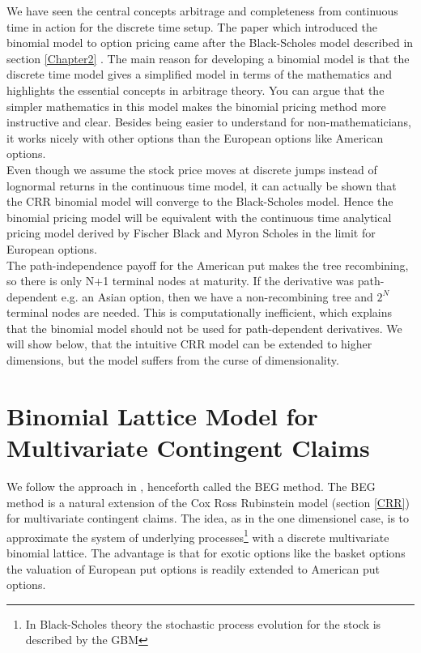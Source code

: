 We have seen the central concepts arbitrage and completeness from continuous time in action for the discrete time setup. The paper \parencite{CRR} which introduced the binomial model to option pricing came after the Black-Scholes model described in section \ref{Chapter2} \parencite{B-S-Paper}. The main reason for developing a binomial model is that the discrete time model gives a simplified model in terms of the mathematics and highlights the essential concepts in arbitrage theory. You can argue that the simpler mathematics in this model makes the binomial pricing method more instructive and clear. Besides being easier to understand for non-mathematicians, it works nicely with other options than the European options like American options. \\

Even though we assume the stock price moves at discrete jumps instead of lognormal returns in the continuous time model, it can actually be shown that the CRR binomial model will converge to the Black-Scholes model. Hence the binomial pricing model will be equivalent with the continuous time analytical pricing model derived by Fischer Black and Myron Scholes in the limit for European options. \\

The path-independence payoff for the American put makes the tree recombining, so there is only N+1 terminal nodes at maturity. If the derivative was path-dependent e.g. an Asian option, then we have a non-recombining tree and $2^{N}$ terminal nodes are needed. This is computationally inefficient, which explains that the binomial model should not be used for path-dependent derivatives. We will show below, that the intuitive CRR model can be extended to higher dimensions, but the model suffers from the curse of dimensionality.

\newpage
\section{Binomial Lattice Model for Multivariate Contingent Claims}
We follow the approach in \parencite{BEG}, henceforth called the BEG method. The BEG method is a natural extension of the Cox Ross Rubinstein model (section \ref{CRR}) for multivariate contingent claims. The idea, as in the one dimensionel case, is to approximate the system of underlying processes\footnote{In Black-Scholes theory the stochastic process evolution for the stock is described by the GBM} with a discrete multivariate binomial lattice. The advantage is that for exotic options like the basket options the valuation of European put options is readily extended to American put options. \\

